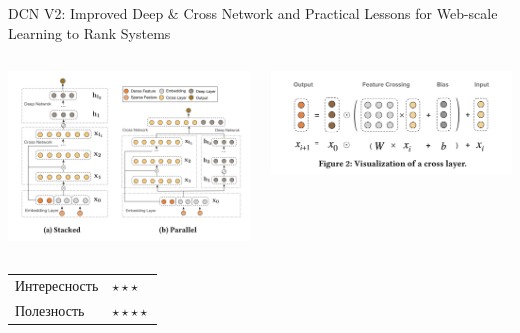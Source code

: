 \documentclass[11pt,aspectratio=169]{beamer}
\begin{document}
\begin{frame}{DCN V2: Improved Deep \& Cross Network and Practical Lessons for Web-scale Learning to Rank Systems \cite{DCN}}

\begin{columns}
\begin{column}{0.45\textwidth} 
\begin{center}
\includegraphics[scale=0.3]{images/dcn-arch.png}
\end{center}
\end{column}
\begin{column}{0.45\textwidth}
\begin{center}
\includegraphics[scale=0.3]{images/dcn-block.png}
\end{center}
\end{column}
\end{columns}

\begin{tabular}{l l}
Интересность & $\star\star\star$ \\
Полезность & $\star\star\star\star$
\end{tabular}

\end{frame}
\end{document}
